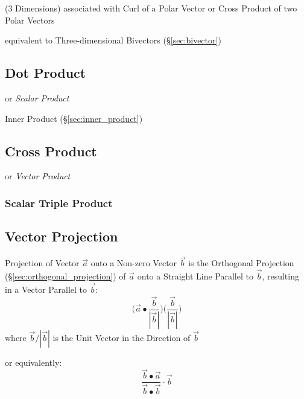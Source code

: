 (3 Dimensions) associated with Curl of a Polar Vector or Cross Product of two
Polar Vectors

equivalent to Three-dimensional Bivectors (\S\ref{sec:bivector})



\subsection{Dot Product}\label{sec:dot_product}

or \emph{Scalar Product}

Inner Product (\S\ref{sec:inner_product})



\subsection{Cross Product}\label{sec:cross_product}

or \emph{Vector Product}



\subsubsection{Scalar Triple Product}\label{sec:scalar_triple_product}



\subsection{Vector Projection}\label{sec:vector_projection}

Projection of Vector $\vec{a}$ onto a Non-zero Vector $\vec{b}$ is the
Orthogonal Projection (\S\ref{sec:orthogonal_projection}) of $\vec{a}$ onto a
Straight Line Parallel to $\vec{b}$, resulting in a Vector Parallel to
$\vec{b}$:
\[
  \big(\vec{a} \bullet \frac{\vec{b}}{|\vec{b}|}\big)
  \big(\frac{\vec{b}}{|\vec{b}|}\big)
\]
where $\vec{b}/|\vec{b}|$ is the Unit Vector in the Direction of $\vec{b}$

or equivalently:
\[
\frac{\vec{b} \bullet \vec{a}}
  {\vec{b} \bullet \vec{b}} \cdot \vec{b}
\]



